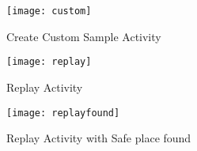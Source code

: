 \begin{wrapfigure}{R}{0.3\textwidth}
\centering
\texttt{[image: custom]}
\caption{\label{fig:custom}Create Custom Sample Activity}
\end{wrapfigure}

\begin{wrapfigure}{R}{0.3\textwidth}
\centering
\texttt{[image: replay]}
\caption{\label{fig:replay}Replay Activity}
\end{wrapfigure}

\begin{wrapfigure}{R}{0.3\textwidth}
\centering
\texttt{[image: replayfound]}
\caption{\label{fig:replayfround}Replay Activity with Safe place found}
\end{wrapfigure}
